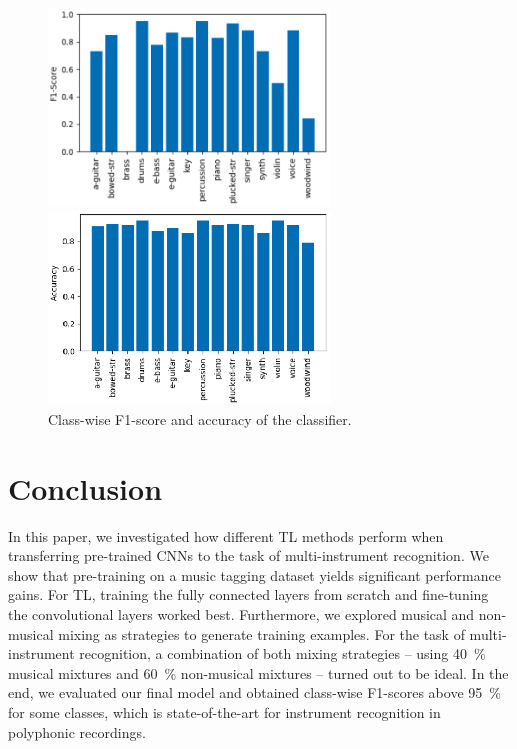 \documentclass{article}
\begin{document}
\begin{figure}[htb]
\begin{center}
	\begin{minipage}[b]{0.8\linewidth}
		\centering
		\centerline{\includegraphics[width=7.5cm]{f1-scores.png}}
		  \vspace{0.1cm}
	\end{minipage}
	\begin{minipage}[b]{0.8\linewidth}
		\centering
		\centerline{\includegraphics[width=7.5cm]{accuracy.png}}
	\end{minipage}
	\caption{Class-wise F1-score and accuracy of the classifier.}
	\label{fig:classifier-performance}
 \end{center}
\end{figure}
\vspace{-3mm}
\section{Conclusion}
\label{sec:conclusion}
In this paper, we investigated how different TL methods perform when transferring pre-trained CNNs to the task of multi-instrument recognition. We show that pre-training on a music tagging dataset yields significant performance gains. For TL, training the fully connected layers from scratch and fine-tuning the convolutional layers worked best. Furthermore, we explored musical and non-musical mixing as strategies to generate training examples. For the task of multi-instrument recognition, a combination of both mixing strategies -- using \SI{40}{\percent} musical mixtures and \SI{60}{\percent} non-musical mixtures -- turned out to be ideal. In the end, we evaluated our final model and obtained class-wise F1-scores above \SI{95}{\percent} for some classes, which is state-of-the-art for instrument recognition in polyphonic recordings.
\end{document}
